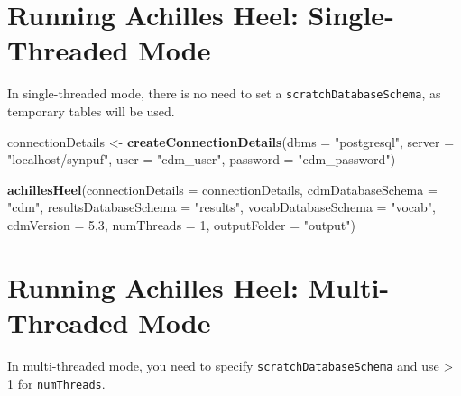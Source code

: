 \documentclass[]{article}
\newenvironment{Shaded}{\begin{snugshade}}{\end{snugshade}}
\newcommand{\KeywordTok}[1]{\textcolor[rgb]{0.13,0.29,0.53}{\textbf{#1}}}
\newcommand{\DataTypeTok}[1]{\textcolor[rgb]{0.13,0.29,0.53}{#1}}
\newcommand{\DecValTok}[1]{\textcolor[rgb]{0.00,0.00,0.81}{#1}}
\newcommand{\FloatTok}[1]{\textcolor[rgb]{0.00,0.00,0.81}{#1}}
\newcommand{\StringTok}[1]{\textcolor[rgb]{0.31,0.60,0.02}{#1}}
\newcommand{\NormalTok}[1]{#1}
\begin{document}
\section{Running Achilles Heel: Single-Threaded
Mode}\label{running-achilles-heel-single-threaded-mode}

In single-threaded mode, there is no need to set a
\texttt{scratchDatabaseSchema}, as temporary tables will be used.

\begin{Shaded}
\begin{Highlighting}[]
\NormalTok{connectionDetails <-}\StringTok{ }\KeywordTok{createConnectionDetails}\NormalTok{(}\DataTypeTok{dbms =} \StringTok{"postgresql"}\NormalTok{, }
                                             \DataTypeTok{server =} \StringTok{"localhost/synpuf"}\NormalTok{, }
                                             \DataTypeTok{user =} \StringTok{"cdm_user"}\NormalTok{, }
                                             \DataTypeTok{password =} \StringTok{"cdm_password"}\NormalTok{)}

\KeywordTok{achillesHeel}\NormalTok{(}\DataTypeTok{connectionDetails =}\NormalTok{ connectionDetails, }
             \DataTypeTok{cdmDatabaseSchema =} \StringTok{"cdm"}\NormalTok{, }
             \DataTypeTok{resultsDatabaseSchema =} \StringTok{"results"}\NormalTok{, }
             \DataTypeTok{vocabDatabaseSchema =} \StringTok{"vocab"}\NormalTok{, }
             \DataTypeTok{cdmVersion =} \FloatTok{5.3}\NormalTok{, }
             \DataTypeTok{numThreads =} \DecValTok{1}\NormalTok{, }
             \DataTypeTok{outputFolder =} \StringTok{"output"}\NormalTok{)}
\end{Highlighting}
\end{Shaded}

\section{Running Achilles Heel: Multi-Threaded
Mode}\label{running-achilles-heel-multi-threaded-mode}

In multi-threaded mode, you need to specify
\texttt{scratchDatabaseSchema} and use \textgreater{} 1 for
\texttt{numThreads}.
\end{document}
